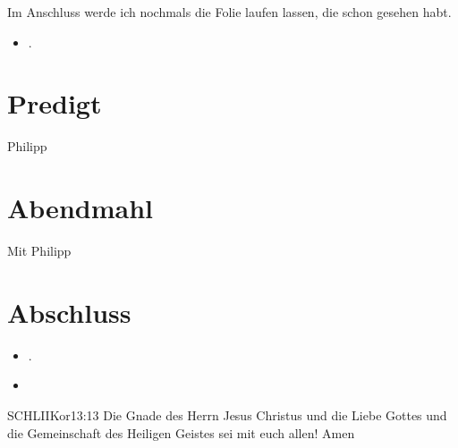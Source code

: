 \documentclass[fontsize=14pt]{mybib}
\newcommand{\Name}{Philipp}
\begin{document}
Im Anschluss werde ich nochmals die Folie laufen lassen, die schon gesehen habt.
\begin{itemize}
    \item {}.
\end{itemize}
\section{Predigt}
    \Name
\section{Abendmahl}
    Mit \Name
\section{Abschluss}
\begin{itemize}
    \item {}.
    \item {}
\end{itemize}
\begin{bibelbox}{SCHL}{IIKor}{13:13}
    Die Gnade des Herrn Jesus Christus und die Liebe Gottes und die Gemeinschaft des Heiligen Geistes sei mit euch allen! Amen
\end{bibelbox}
\end{document}
